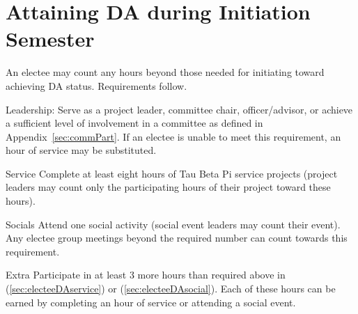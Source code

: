 \section{Attaining DA during Initiation Semester} An electee may count any hours beyond those needed for initiating toward achieving DA status. Requirements follow.
\begin{enumsubsection}
\item{Leadership:} Serve as a project leader, committee chair,  officer/advisor, or achieve a sufficient level of involvement in a committee as defined in Appendix~\ref{sec:commPart}. If an electee is unable to meet this requirement, an hour of service may be substituted.
\item{Service}\label{sec:electeeDAservice} Complete at least eight hours of Tau Beta Pi service projects (project leaders may count only the participating hours of their project toward these hours). 
\item{Socials} \label{sec:electeeDAsocial} Attend one social activity (social event leaders may count their event). Any electee group meetings beyond the required number can count towards this requirement.
\item{Extra} Participate in at least 3 more hours than required above in (\ref{sec:electeeDAservice}) or (\ref{sec:electeeDAsocial}). Each of these hours can be earned by completing an hour of service or attending a social event.
\end{enumsubsection}
